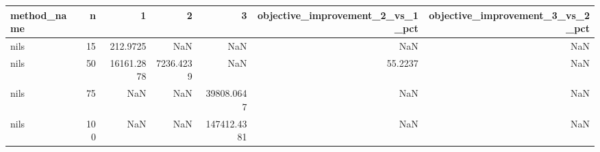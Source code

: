 \begin{tabular}{lrrrrrr}
\toprule
method_name & n & 1 & 2 & 3 & objective_improvement_2_vs_1_pct & objective_improvement_3_vs_2_pct \\
\midrule
nils & 15 & 212.9725 & NaN & NaN & NaN & NaN \\
nils & 50 & 16161.2878 & 7236.4239 & NaN & 55.2237 & NaN \\
nils & 75 & NaN & NaN & 39808.0647 & NaN & NaN \\
nils & 100 & NaN & NaN & 147412.4381 & NaN & NaN \\
\bottomrule
\end{tabular}
